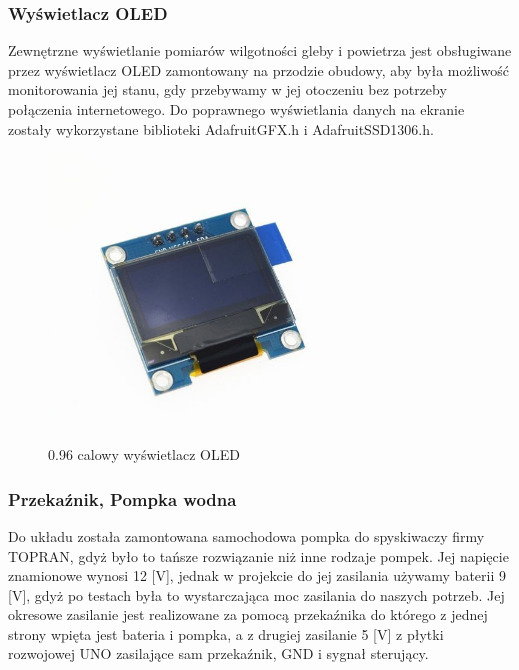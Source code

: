\documentclass[12pt]{article}
\begin{document}
\subsubsection{Wyświetlacz OLED}
Zewnętrzne wyświetlanie pomiarów wilgotności gleby i powietrza jest obsługiwane przez wyświetlacz OLED zamontowany na przodzie obudowy, aby była możliwość monitorowania jej stanu, gdy przebywamy w jej otoczeniu bez potrzeby połączenia internetowego. Do poprawnego wyświetlania danych na ekranie zostały wykorzystane biblioteki AdafruitGFX.h i AdafruitSSD1306.h.
\begin{figure}[!h]
	\begin{center}
		{\includegraphics[width=8cm]{oled-display_photo.png}}
	\end{center}
	\caption{0.96 calowy wyświetlacz OLED}
\end{figure}

\subsubsection{Przekaźnik, Pompka wodna}
Do układu została zamontowana samochodowa pompka do spyskiwaczy firmy TOPRAN, gdyż było to tańsze rozwiązanie niż inne rodzaje pompek. Jej napięcie znamionowe wynosi 12 [V], jednak w projekcie do jej zasilania używamy baterii 9 [V], gdyż po testach była to wystarczająca moc zasilania do naszych potrzeb. Jej okresowe zasilanie jest realizowane za pomocą przekaźnika do którego z jednej strony wpięta jest bateria i pompka, a z drugiej zasilanie 5 [V] z płytki rozwojowej UNO zasilające sam przekaźnik, GND i sygnał sterujący.
\end{document}
